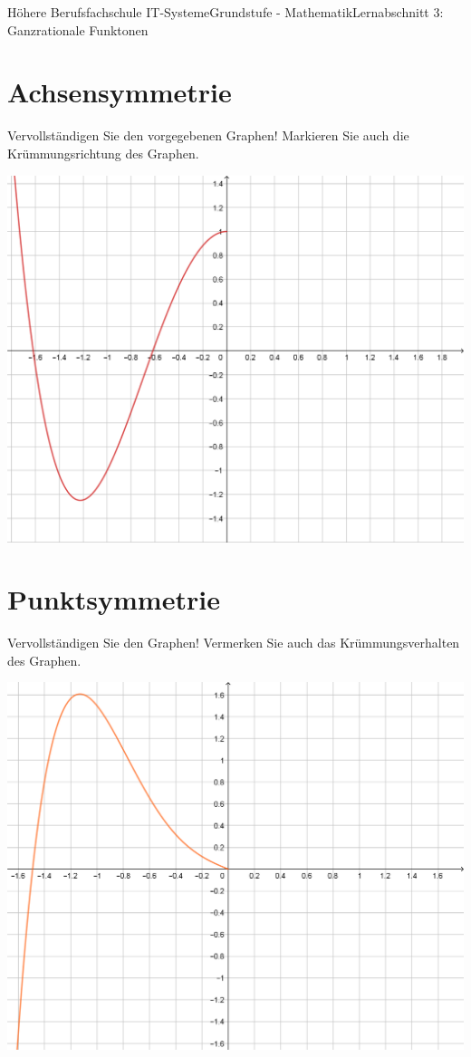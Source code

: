 \documentclass[oneside,openany,headings=optiontotoc,11pt,numbers=noenddot]{scrreprt}
\begin{document}
	\begin{worksheet}{Höhere Berufsfachschule IT-Systeme}{Grundstufe - Mathematik}{Lernabschnitt 3: Ganzrationale Funktonen}
		\section*{Achsensymmetrie}
		Vervollständigen Sie den vorgegebenen Graphen! Markieren Sie auch die Krümmungsrichtung des Graphen.\\
		\par\noindent
		\includegraphics[width=\textwidth]{../99_Bilder/asymm_ueb.png}\\
		\newpage
		\section*{Punktsymmetrie}
		Vervollständigen Sie den Graphen! Vermerken Sie auch das Krümmungsverhalten des Graphen.\\
		\par\noindent
		\includegraphics[width=\textwidth]{../99_Bilder/psymm_ueb.png}
	\end{worksheet}
\end{document}
